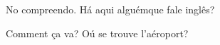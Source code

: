 \documentclass{article}
\begin{document}
No compreendo. H\'{a} aqui algu\'{e}mque fale ingl\^{e}s?

Comment \c{c}a va? O\'{u} se trouve l'a\'{e}roport?
\end{document}
